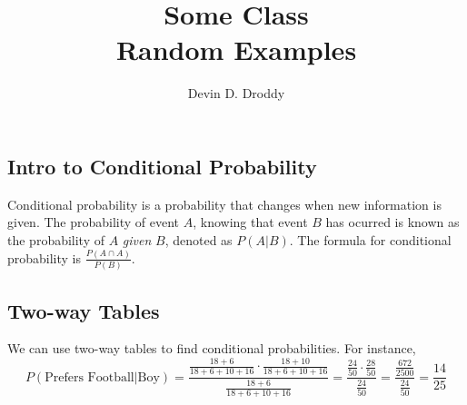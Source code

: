 \documentclass{report}
\title{\Huge{Some Class}\\Random Examples}
\author{\huge{Devin D. Droddy}}
\date{}
\begin{document}
\maketitle
\newpage%
\tableofcontents
\pagebreak

\chapter{}

\section{Intro to Conditional Probability}

Conditional probability is a probability that changes when new information is given. The probability of event $A$, knowing that event $B$ has ocurred is known as the probability of $A$ \textit{given} $B$, denoted as $P(A|B)$. The formula for conditional probability is $\frac{P(A \cap A)}{P(B)}$.

\section{Two-way Tables}



We can use two-way tables to find conditional probabilities. For instance,
\[
	P(\text{Prefers Football} | \text{Boy})=\frac{\frac{18 + 6}{18 + 6 + 10 + 16} \cdot \frac{18 + 10}{18 + 6 + 10 + 16}}{\frac{18 + 6}{18 + 6 + 10 + 16}}=\frac{\frac{24}{50} \cdot \frac{28}{50}}{\frac{24}{50}}=\frac{\frac{672}{2500}}{\frac{24}{50}}=\frac{14}{25}
\]
\end{document}
